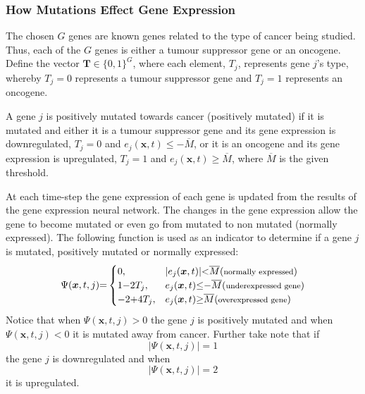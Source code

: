 \documentclass[\main/thesis.tex]{subfiles}
\begin{document}
\subsubsection{How Mutations Effect Gene Expression}
The chosen $G$ genes are known genes related to the type of cancer being studied.
Thus, each of the $G$ genes is either a tumour suppressor gene or an oncogene.
Define the vector $\boldsymbol{T} {\in} \{ 0, 1 \}^G$, where each element, 
$T_{j}$, represents gene $j$'s type, whereby $T_{j} {=} 0$ 
represents a tumour suppressor gene and $T_{j} {=} 1$ represents an oncogene.

A gene $j$ is positively mutated towards cancer (positively mutated) if it is mutated and either it is a tumour suppressor gene and its gene expression is downregulated, $T_j {=} 0$ and $e_j(\boldsymbol{x}, t) {\le} -\overline{M}$, or it is an oncogene and its gene expression is upregulated, $T_j {=} 1$ and $e_j(\boldsymbol{x}, t) {\ge} \overline{M}$, where $\overline{M}$ is the given threshold.

At each time-step the gene expression of each gene is updated from the results 
of the gene expression neural network. The changes in the gene expression allow 
the gene to become mutated or even go from mutated to non mutated (normally 
expressed). The following function is used as an indicator to determine if a gene $j$ is mutated, positively mutated or normally expressed:
\begin{equation}
\Psi(\boldsymbol{x}, t, j) {=} \begin{cases}
                             0, & |e_j(\boldsymbol{x}, t)| {<} \overline{M} 
                               (\text{{\footnotesize normally expressed}})\\
                             1 {-} 2T_j, & e_j(\boldsymbol{x}, t) {\le} {-}\overline{M}
                               (\text{{\footnotesize underexpressed gene}}) \\
                             {-}2 {+} 4T_j, & e_j(\boldsymbol{x}, t) {\ge} \overline{M} 
                               (\text{{\footnotesize overexpressed gene}})
                        \end{cases}
\label{eq:MutationFunc}
\end{equation}
Notice that when $\Psi(\boldsymbol{x}, t, j) {>} 0$ the gene $j$ is positively mutated and when $\Psi(\boldsymbol{x}, t, j) {<} 0$ it is mutated away from cancer. Further take note that if $$|\Psi(\boldsymbol{x}, t, j)| {=} 1$$ the gene $j$ is downregulated and when $$|\Psi(\boldsymbol{x}, t, j)| {=} 2$$ it is upregulated. 
\end{document}
